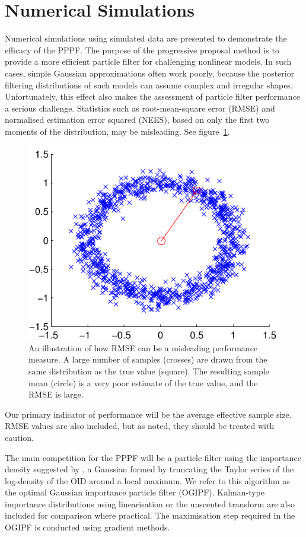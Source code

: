 \documentclass{article}
\begin{document}
\section{Numerical Simulations}

Numerical simulations using simulated data are presented to demonstrate the efficacy of the PPPF. The purpose of the progressive proposal method is to provide a more efficient particle filter for challenging nonlinear models. In such cases, simple Gaussian approximations often work poorly, because the posterior filtering distributions of such models can assume complex and irregular shapes. Unfortunately, this effect also makes the assessment of particle filter performance a serious challenge. Statistics such as root-mean-square error (RMSE) and normalised estimation error squared (NEES), based on only the first two moments of the distribution, may be misleading. See figure~\ref{fig:rmse_fail}.
%
\begin{figure}
\centering
\includegraphics[width=0.7\columnwidth]{rmse_fail.pdf}
\caption{An illustration of how RMSE can be a misleading performance measure. A large number of samples (crosses) are drawn from the same distribution as the true value (square). The resulting sample mean (circle) is a very poor estimate of the true value, and the RMSE is large.}
\label{fig:rmse_fail}
\end{figure}

Our primary indicator of performance will be the average effective sample size. RMSE values are also included, but as noted, they should be treated with caution.

The main competition for the PPPF will be a particle filter using the importance density suggested by \citet{Doucet2000a}, a Gaussian formed by truncating the Taylor series of the log-density of the OID around a local maximum. We refer to this algorithm as the optimal Gaussian importance particle filter (OGIPF). Kalman-type importance distributions using linearisation or the unscented transform are also included for comparison where practical. The maximisation step required in the OGIPF is conducted using gradient methods.
\end{document}
